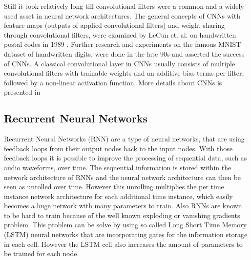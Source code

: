 Still it took relatively long till convolutional filters were a common and a widely used asset in neural network architectures.
The general concepts of CNNs with feature maps (outputs of applied convolutional filters) and weight sharing through convolutional filters, were examined by LeCun et. al. on handwritten postal codes in 1989 \cite{LeCun1989_Generalization}.
Further research and experiments on the famous MNIST dataset of handwritten digits, were done in the late 90s \cite{LeCun1998} and asserted the success of CNNs.
A classical convolutional layer in CNNs usually consists of multiple convolutional filters with trainable weights and an additive bias terms per filter, followed by a non-linear activation function.
More details about CNNs is presented in



  



\subsection{Recurrent Neural Networks}\label{sec:prev_nn_rnn}
Recurrent Neural Networks (RNN) are a type of neural networks, that are using feedback loops from their output nodes back to the input nodes.
With those feedback loops it is possible to improve the processing of sequential data, such as audio waveforms, over time.
The sequential information is stored within the network architecture of RNNs and the neural network architecture can then be seen as unrolled over time.
However this unrolling multiplies the per time instance network architecture for each additional time instance, which easily becomes a huge network with many parameters to train.
Also RNNs are known to be hard to train because of the well known exploding or vanishing gradients problem.
This problem can be solve by using so called Long Short Time Memory (LSTM) neural networks that are incorporating gates for the information storage in each cell. 
However the LSTM cell also increases the amount of parameters to be trained for each node.

